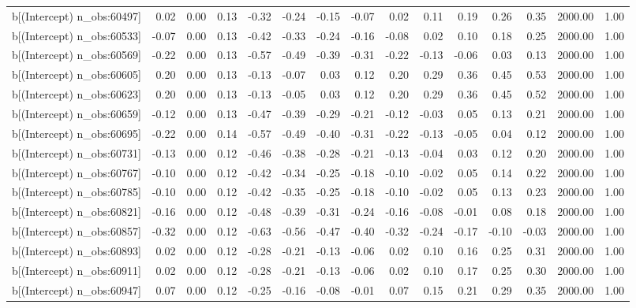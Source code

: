 \begin{table}[ht]
\begin{tabular}{rrrrrrrrrrrrrrr}
  b[(Intercept) n\_obs:60497] & 0.02 & 0.00 & 0.13 & -0.32 & -0.24 & -0.15 & -0.07 & 0.02 & 0.11 & 0.19 & 0.26 & 0.35 & 2000.00 & 1.00 \\ 
  b[(Intercept) n\_obs:60533] & -0.07 & 0.00 & 0.13 & -0.42 & -0.33 & -0.24 & -0.16 & -0.08 & 0.02 & 0.10 & 0.18 & 0.25 & 2000.00 & 1.00 \\ 
  b[(Intercept) n\_obs:60569] & -0.22 & 0.00 & 0.13 & -0.57 & -0.49 & -0.39 & -0.31 & -0.22 & -0.13 & -0.06 & 0.03 & 0.13 & 2000.00 & 1.00 \\ 
  b[(Intercept) n\_obs:60605] & 0.20 & 0.00 & 0.13 & -0.13 & -0.07 & 0.03 & 0.12 & 0.20 & 0.29 & 0.36 & 0.45 & 0.53 & 2000.00 & 1.00 \\ 
  b[(Intercept) n\_obs:60623] & 0.20 & 0.00 & 0.13 & -0.13 & -0.05 & 0.03 & 0.12 & 0.20 & 0.29 & 0.36 & 0.45 & 0.52 & 2000.00 & 1.00 \\ 
  b[(Intercept) n\_obs:60659] & -0.12 & 0.00 & 0.13 & -0.47 & -0.39 & -0.29 & -0.21 & -0.12 & -0.03 & 0.05 & 0.13 & 0.21 & 2000.00 & 1.00 \\ 
  b[(Intercept) n\_obs:60695] & -0.22 & 0.00 & 0.14 & -0.57 & -0.49 & -0.40 & -0.31 & -0.22 & -0.13 & -0.05 & 0.04 & 0.12 & 2000.00 & 1.00 \\ 
  b[(Intercept) n\_obs:60731] & -0.13 & 0.00 & 0.12 & -0.46 & -0.38 & -0.28 & -0.21 & -0.13 & -0.04 & 0.03 & 0.12 & 0.20 & 2000.00 & 1.00 \\ 
  b[(Intercept) n\_obs:60767] & -0.10 & 0.00 & 0.12 & -0.42 & -0.34 & -0.25 & -0.18 & -0.10 & -0.02 & 0.05 & 0.14 & 0.22 & 2000.00 & 1.00 \\ 
  b[(Intercept) n\_obs:60785] & -0.10 & 0.00 & 0.12 & -0.42 & -0.35 & -0.25 & -0.18 & -0.10 & -0.02 & 0.05 & 0.13 & 0.23 & 2000.00 & 1.00 \\ 
  b[(Intercept) n\_obs:60821] & -0.16 & 0.00 & 0.12 & -0.48 & -0.39 & -0.31 & -0.24 & -0.16 & -0.08 & -0.01 & 0.08 & 0.18 & 2000.00 & 1.00 \\ 
  b[(Intercept) n\_obs:60857] & -0.32 & 0.00 & 0.12 & -0.63 & -0.56 & -0.47 & -0.40 & -0.32 & -0.24 & -0.17 & -0.10 & -0.03 & 2000.00 & 1.00 \\ 
  b[(Intercept) n\_obs:60893] & 0.02 & 0.00 & 0.12 & -0.28 & -0.21 & -0.13 & -0.06 & 0.02 & 0.10 & 0.16 & 0.25 & 0.31 & 2000.00 & 1.00 \\ 
  b[(Intercept) n\_obs:60911] & 0.02 & 0.00 & 0.12 & -0.28 & -0.21 & -0.13 & -0.06 & 0.02 & 0.10 & 0.17 & 0.25 & 0.30 & 2000.00 & 1.00 \\ 
  b[(Intercept) n\_obs:60947] & 0.07 & 0.00 & 0.12 & -0.25 & -0.16 & -0.08 & -0.01 & 0.07 & 0.15 & 0.21 & 0.29 & 0.35 & 2000.00 & 1.00 \\ 

\end{tabular}
\end{table}
